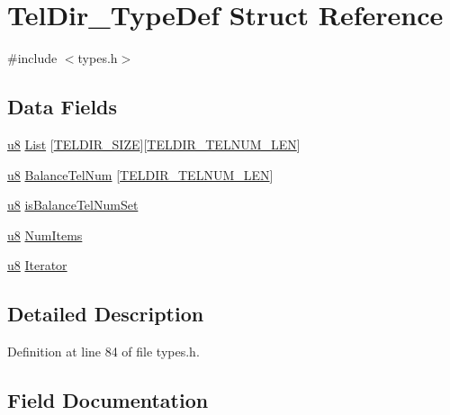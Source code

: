 \hypertarget{struct_tel_dir___type_def}{}\section{Tel\+Dir\+\_\+\+Type\+Def Struct Reference}
\label{struct_tel_dir___type_def}


{\ttfamily \#include $<$types.\+h$>$}

\subsection*{Data Fields}
\begin{DoxyCompactItemize}
\item 
\hyperlink{types_8h_aed742c436da53c1080638ce6ef7d13de}{u8} \hyperlink{struct_tel_dir___type_def_ae296be071cbe46eed001ab486d4882bb}{List} \mbox{[}\hyperlink{types_8h_ab88f93f94cc99136786590f68a11f782}{T\+E\+L\+D\+I\+R\+\_\+\+S\+I\+Z\+E}\mbox{]}\mbox{[}\hyperlink{types_8h_a4b8203c0fd4420affbfe3c56ac858b0b}{T\+E\+L\+D\+I\+R\+\_\+\+T\+E\+L\+N\+U\+M\+\_\+\+L\+E\+N}\mbox{]}
\item 
\hyperlink{types_8h_aed742c436da53c1080638ce6ef7d13de}{u8} \hyperlink{struct_tel_dir___type_def_a3f3c99353bd68df9c2a2883156c74b4f}{Balance\+Tel\+Num} \mbox{[}\hyperlink{types_8h_a4b8203c0fd4420affbfe3c56ac858b0b}{T\+E\+L\+D\+I\+R\+\_\+\+T\+E\+L\+N\+U\+M\+\_\+\+L\+E\+N}\mbox{]}
\item 
\hyperlink{types_8h_aed742c436da53c1080638ce6ef7d13de}{u8} \hyperlink{struct_tel_dir___type_def_abb5d78a0d404af96d31c3cf9255aa270}{is\+Balance\+Tel\+Num\+Set}
\item 
\hyperlink{types_8h_aed742c436da53c1080638ce6ef7d13de}{u8} \hyperlink{struct_tel_dir___type_def_a84d6da72470ad7fca2b7482887203f3e}{Num\+Items}
\item 
\hyperlink{types_8h_aed742c436da53c1080638ce6ef7d13de}{u8} \hyperlink{struct_tel_dir___type_def_a020857a514cc8d2c6dee60d096ae33a3}{Iterator}
\end{DoxyCompactItemize}


\subsection{Detailed Description}


Definition at line 84 of file types.\+h.



\subsection{Field Documentation}
\hypertarget{struct_tel_dir___type_def_a3f3c99353bd68df9c2a2883156c74b4f}{}
